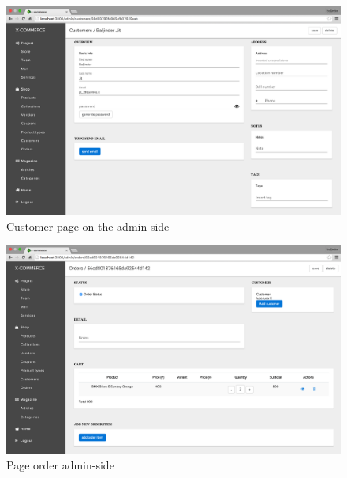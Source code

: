 \begin{figure}[htb]
\centering
\includegraphics[width=1.0\linewidth]{images/chapter4/page-customer.png}\hfill
\caption[Customer page on the admin-side]{Customer page on the admin-side}
\label{fig:page_customer_admin}
\end{figure}
\begin{figure}[htb]
\centering
\includegraphics[width=1.0\linewidth]{images/chapter4/page-order-all.png}\hfill
\caption[page order admin-side]{Page order admin-side}
\label{fig:page_order_admin}
\end{figure}
